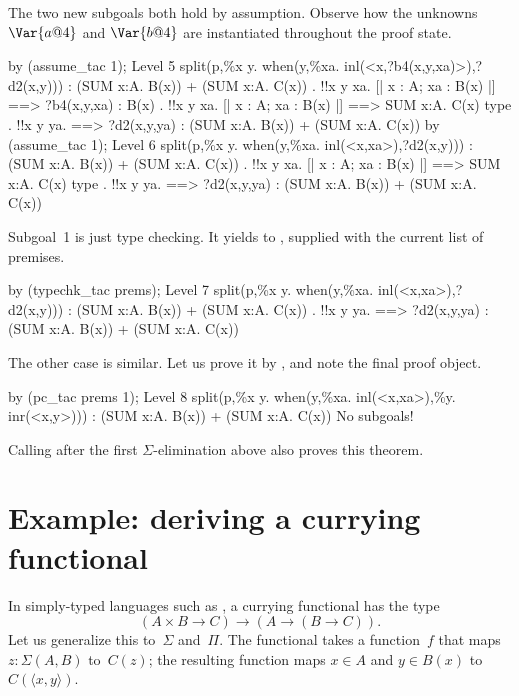 The two new subgoals both hold by assumption.  Observe how the unknowns
$\Var{a@4}$ and $\Var{b@4}$ are instantiated throughout the proof state.
\begin{ttbox}
by (assume_tac 1);
{\out Level 5}
{\out split(p,\%x y. when(y,\%xa. inl(<x,?b4(x,y,xa)>),?d2(x,y)))}
{\out : (SUM x:A. B(x)) + (SUM x:A. C(x))}
\ttbreak
{. !!x y xa. [| x : A; xa : B(x) |] ==> ?b4(x,y,xa) : B(x)}
{. !!x y xa. [| x : A; xa : B(x) |] ==> SUM x:A. C(x) type}
{. !!x y ya.}
{\out        [| x : A; ya : C(x) |] ==>}
{\out        ?d2(x,y,ya) : (SUM x:A. B(x)) + (SUM x:A. C(x))}
\ttbreak
by (assume_tac 1);
{\out Level 6}
{\out split(p,\%x y. when(y,\%xa. inl(<x,xa>),?d2(x,y)))}
{\out : (SUM x:A. B(x)) + (SUM x:A. C(x))}
{. !!x y xa. [| x : A; xa : B(x) |] ==> SUM x:A. C(x) type}
{. !!x y ya.}
{\out        [| x : A; ya : C(x) |] ==>}
{\out        ?d2(x,y,ya) : (SUM x:A. B(x)) + (SUM x:A. C(x))}
\end{ttbox}
Subgoal~1 is just type checking.  It yields to ,
supplied with the current list of premises.
\begin{ttbox}
by (typechk_tac prems);
{\out Level 7}
{\out split(p,\%x y. when(y,\%xa. inl(<x,xa>),?d2(x,y)))}
{\out : (SUM x:A. B(x)) + (SUM x:A. C(x))}
{. !!x y ya.}
{\out        [| x : A; ya : C(x) |] ==>}
{\out        ?d2(x,y,ya) : (SUM x:A. B(x)) + (SUM x:A. C(x))}
\end{ttbox}
The other case is similar.  Let us prove it by , and note
the final proof object.
\begin{ttbox}
by (pc_tac prems 1);
{\out Level 8}
{\out split(p,\%x y. when(y,\%xa. inl(<x,xa>),\%y. inr(<x,y>)))}
{\out : (SUM x:A. B(x)) + (SUM x:A. C(x))}
{\out No subgoals!}
\end{ttbox}
Calling  after the first $\Sigma$-elimination above also
proves this theorem.


\section{Example: deriving a currying functional}
In simply-typed languages such as {\ML}, a currying functional has the type 
\[ (A\times B \to C) \to (A\to (B\to C)). \]
Let us generalize this to~$\Sigma$ and~$\Pi$.  
The functional takes a function~$f$ that maps $z:\Sigma(A,B)$
to~$C(z)$; the resulting function maps $x\in A$ and $y\in B(x)$ to
$C(\langle x,y\rangle)$.

